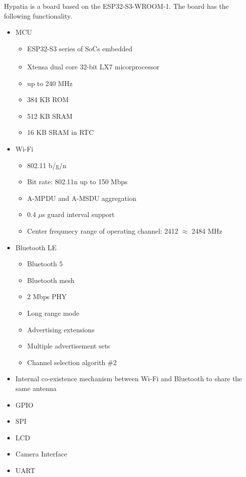 \bigskip

Hypatia is a board based on the ESP32-S3-WROOM-1. The board has the following functionality.

\begin{itemize}
  \item   MCU
    \begin{itemize}
        \item ESP32-S3 series of SoCs embedded
        \item Xtensa\textsuperscript{\textregistered} dual core 32-bit LX7 micorprocessor
        \item up to 240 MHz
        \item 384 KB ROM
        \item 512 KB SRAM
        \item 16 KB SRAM in RTC
    \end{itemize}
  \item Wi-Fi
    \begin{itemize}
        \item 802.11 b/g/n
        \item Bit rate: 802.11n up to 150 Mbps
        \item A-MPDU and A-MSDU aggregation
        \item 0.4 $\mu$s guard interval support
        \item Center frequnecy range of operating channel: 2412 $\approx$ 2484 MHz
    \end{itemize}
  \item Bluetooth LE
    \begin{itemize}
        \item Bluetooth 5
        \item Bluetooth mesh
        \item 2 Mbps PHY
        \item Long range mode
        \item Advertising extensions
        \item Multiple advertisement sets
        \item Channel selection algorith \#2
    \end{itemize}
  \item Internal co-existence mechanism between Wi-Fi and Bluetooth to share the same antenna
  \item GPIO
  \item SPI
  \item LCD
  \item Camera Interface
  \item UART

\end{itemize}
